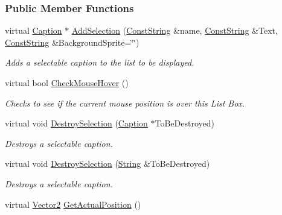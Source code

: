 \subsubsection*{Public Member Functions}
\begin{DoxyCompactItemize}
\item 
virtual \hyperlink{classphys_1_1UI_1_1Caption}{Caption} $\ast$ \hyperlink{classphys_1_1UI_1_1ListBox_aa6069fc3690e09142033886d9d7b0b3a}{AddSelection} (\hyperlink{namespacephys_a5ce5049f8b4bf88d6413c47b504ebb31}{ConstString} \&name, \hyperlink{namespacephys_a5ce5049f8b4bf88d6413c47b504ebb31}{ConstString} \&Text, \hyperlink{namespacephys_a5ce5049f8b4bf88d6413c47b504ebb31}{ConstString} \&BackgroundSprite=\char`\"{}\char`\"{})
\begin{DoxyCompactList}\small\item\em Adds a selectable caption to the list to be displayed. \item\end{DoxyCompactList}\item 
virtual bool \hyperlink{classphys_1_1UI_1_1ListBox_a789faeb98d98bb4d4d89cae8c53d4bc0}{CheckMouseHover} ()
\begin{DoxyCompactList}\small\item\em Checks to see if the current mouse position is over this List Box. \item\end{DoxyCompactList}\item 
virtual void \hyperlink{classphys_1_1UI_1_1ListBox_a295acf830ed17c78a59e5ba871a5a234}{DestroySelection} (\hyperlink{classphys_1_1UI_1_1Caption}{Caption} $\ast$ToBeDestroyed)
\begin{DoxyCompactList}\small\item\em Destroys a selectable caption. \item\end{DoxyCompactList}\item 
virtual void \hyperlink{classphys_1_1UI_1_1ListBox_a3aa3bfaee473b7590692e8707dada68d}{DestroySelection} (\hyperlink{namespacephys_aa03900411993de7fbfec4789bc1d392e}{String} \&ToBeDestroyed)
\begin{DoxyCompactList}\small\item\em Destroys a selectable caption. \item\end{DoxyCompactList}\item 
virtual \hyperlink{classphys_1_1Vector2}{Vector2} \hyperlink{classphys_1_1UI_1_1ListBox_a44046453283fb2c54e10dc868705352a}{GetActualPosition} ()

\end{DoxyCompactItemize}
